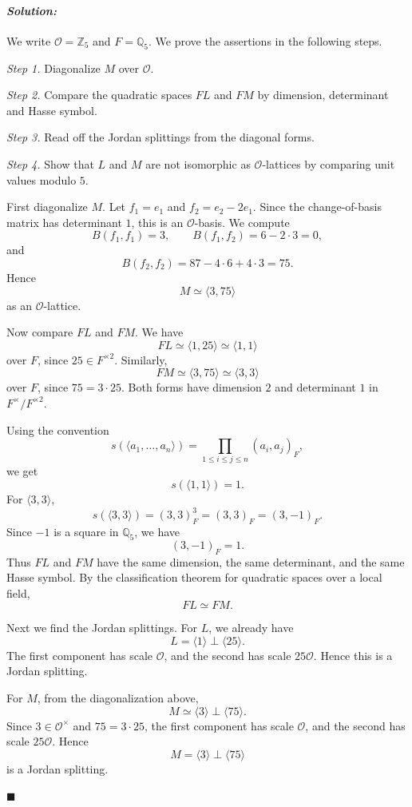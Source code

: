 \documentclass[12pt, a4paper]{article}
\newenvironment{solution}
  {\paragraph{\textit{Solution:}}\par\medskip}
  {\hfill$\blacksquare$\vspace{0.1cm}}
\begin{document}
\begin{solution}
We write \(\mathcal O=\mathbb Z_5\) and \(F=\mathbb Q_5\). We prove the
assertions in the following steps.

\emph{Step 1.} Diagonalize \(M\) over \(\mathcal O\).

\emph{Step 2.} Compare the quadratic spaces \(FL\) and \(FM\) by dimension,
determinant and Hasse symbol.

\emph{Step 3.} Read off the Jordan splittings from the diagonal forms.

\emph{Step 4.} Show that \(L\) and \(M\) are not isomorphic as
\(\mathcal O\)-lattices by comparing unit values modulo \(5\).

First diagonalize \(M\). Let \(f_1=e_1\) and \(f_2=e_2-2e_1\). Since the
change-of-basis matrix has determinant \(1\), this is an
\(\mathcal O\)-basis. We compute
\[
B(f_1,f_1)=3,\qquad B(f_1,f_2)=6-2\cdot 3=0,
\]
and
\[
B(f_2,f_2)=87-4\cdot 6+4\cdot 3=75.
\]
Hence
\[
M\simeq \langle 3,75\rangle
\]
as an \(\mathcal O\)-lattice.

Now compare \(FL\) and \(FM\). We have
\[
FL\simeq \langle 1,25\rangle \simeq \langle 1,1\rangle
\]
over \(F\), since \(25\in F^{\times 2}\). Similarly,
\[
FM\simeq \langle 3,75\rangle \simeq \langle 3,3\rangle
\]
over \(F\), since \(75=3\cdot 25\). Both forms have dimension \(2\) and
determinant \(1\) in \(F^\times/F^{\times 2}\).

Using the convention
\[
s(\langle a_1,\dots,a_n\rangle)
=
\prod_{1\le i\le j\le n}(a_i,a_j)_F,
\]
we get
\[
s(\langle 1,1\rangle)=1.
\]
For \(\langle 3,3\rangle\),
\[
s(\langle 3,3\rangle)
=(3,3)_F^3=(3,3)_F=(3,-1)_F.
\]
Since \(-1\) is a square in \(\mathbb Q_5\), we have
\[
(3,-1)_F=1.
\]
Thus \(FL\) and \(FM\) have the same dimension, the same determinant, and the
same Hasse symbol. By the classification theorem for quadratic spaces over a
local field,
\[
FL\simeq FM.
\]

Next we find the Jordan splittings. For \(L\), we already have
\[
L=\langle 1\rangle\perp \langle 25\rangle.
\]
The first component has scale \(\mathcal O\), and the second has scale
\(25\mathcal O\). Hence this is a Jordan splitting.

For \(M\), from the diagonalization above,
\[
M\simeq \langle 3\rangle\perp \langle 75\rangle.
\]
Since \(3\in\mathcal O^\times\) and \(75=3\cdot 25\), the first component has
scale \(\mathcal O\), and the second has scale \(25\mathcal O\). Hence
\[
M=\langle 3\rangle\perp \langle 75\rangle
\]
is a Jordan splitting.


\end{solution}
\end{document}
